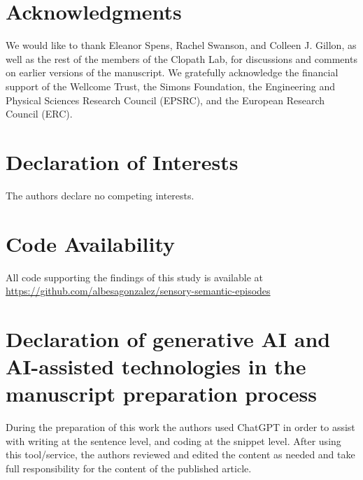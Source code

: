 \documentclass{article}
\begin{document}
\section*{Acknowledgments}
We would like to thank Eleanor Spens, Rachel Swanson, and Colleen J. Gillon, as well as the rest of the members of the Clopath Lab, for discussions and  comments on earlier versions of the manuscript. We gratefully acknowledge the financial support of the Wellcome Trust, the Simons Foundation, the Engineering and Physical Sciences Research Council (EPSRC), and the European Research Council (ERC).
\section*{Declaration of Interests}
The authors declare no competing interests.
\section*{Code Availability}
All code supporting the findings of this study is available at 
\url{https://github.com/albesagonzalez/sensory-semantic-episodes}
\section*{Declaration of generative AI and AI-assisted technologies in the manuscript preparation process}
During the preparation of this work the authors used ChatGPT in order to assist with writing at the sentence level, and coding at the snippet level. After using this tool/service, the authors reviewed and edited the content as needed and take full responsibility for the content of the published article.

\clearpage
\end{document}
